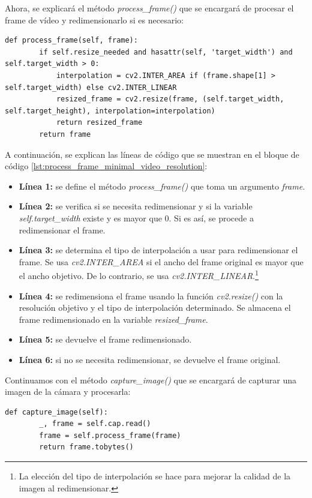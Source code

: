 Ahora, se explicará el método \textit{process\_frame()} que se encargará de procesar el frame de vídeo y redimensionarlo si es necesario:
\begin{lstlisting}[style=pythonstyle, caption={Método process\_frame() de \textit{Minimal\_Video\_Resolution}}, label={lst:process_frame_minimal_video_resolution}]
def process_frame(self, frame):
        if self.resize_needed and hasattr(self, 'target_width') and self.target_width > 0:
            interpolation = cv2.INTER_AREA if (frame.shape[1] > self.target_width) else cv2.INTER_LINEAR
            resized_frame = cv2.resize(frame, (self.target_width, self.target_height), interpolation=interpolation)
            return resized_frame
        return frame
\end{lstlisting}
\vspace{\baselineskip}

A continuación, se explican las líneas de código que se muestran en el bloque de código \ref{lst:process_frame_minimal_video_resolution}:
\begin{itemize}
    \item \textbf{Línea 1:} se define el método \textit{process\_frame()} que toma un argumento \textit{frame}.
    \item \textbf{Línea 2:} se verifica si se necesita redimensionar y si la variable \textit{self.target\_width} existe y es mayor que 0. Si es así, se procede a redimensionar el frame.
    \item \textbf{Línea 3:} se determina el tipo de interpolación a usar para redimensionar el frame. Se usa \textit{cv2.INTER\_AREA} si el ancho del frame original es mayor que el ancho objetivo. De lo contrario, se usa \textit{cv2.INTER\_LINEAR}.\footnote{La elección del tipo de interpolación se hace para mejorar la calidad de la imagen al redimensionar.}
    \item \textbf{Línea 4:} se redimensiona el frame usando la función \textit{cv2.resize()} con la resolución objetivo y el tipo de interpolación determinado. Se almacena el frame redimensionado en la variable \textit{resized\_frame}.
    \item \textbf{Línea 5:} se devuelve el frame redimensionado.
    \item \textbf{Línea 6:} si no se necesita redimensionar, se devuelve el frame original.
\end{itemize}
\vspace{\baselineskip}

Continuamos con el método \textit{capture\_image()} que se encargará de capturar una imagen de la cámara y procesarla:
\begin{lstlisting}[style=pythonstyle, caption={Método capture\_image() de \textit{Minimal\_Video\_Resolution}}, label={lst:capture_image_minimal_video_resolution}]
def capture_image(self):
        _, frame = self.cap.read()
        frame = self.process_frame(frame)
        return frame.tobytes()
\end{lstlisting}
\vspace{\baselineskip}

